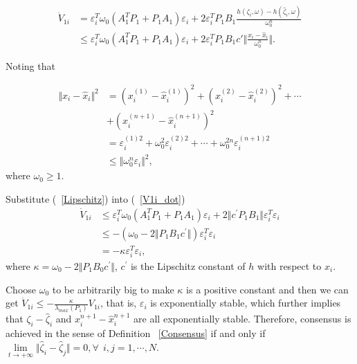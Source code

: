 \documentclass[english]{cccconf}
\begin{document}
\begin{equation}
\label{V1i_dot}
\begin{align}
\dot V_{1i} &= \varepsilon^T_i \omega_0 (A_1^T P_1 + P_1 A_1) \varepsilon_i + 2 \varepsilon^T_i P_1 B_1 \frac{h(\zeta_i,\omega)-h(\hat \zeta_i,\omega)}{\omega_0^n} \\ & \le \varepsilon^T_i \omega_0 (A_1^T P_1 + P_1 A_1) \varepsilon_i + 2 \varepsilon^T_i P_1 B_1 c' \Vert \frac{x_i- \hat x_i}{\omega_0^n} \Vert.  
\end{align}  
\end{equation}

Noting that 

\begin{equation}
  \label{Lipschitz}
  \begin{align} 
   {\Vert {x_i- \hat x_i} \Vert}^2 &= (x_i^{(1)}-\hat x_i^{(1)})^2 +  (x_i^{(2)}-\hat x_i^{(2)})^2 + \cdots \\ & +(x_i^{(n+1)}-\hat x_i^{(n+1)})^2\\ &= \varepsilon_i^{(1)2} + \omega_0^2 \varepsilon_i^{(2)2} + \cdots + \omega_0^{2n} \varepsilon_i^{(n+1)2}\\ &\le {\Vert \omega_0^{n} \varepsilon_i \Vert}^2 ,
  \end{align}
\end{equation} where $\omega_0 \geq 1$.

Substitute (~\ref{Lipschitz}) into (~\ref{V1i_dot})
\begin{equation}
\label{V1i_dot2}
\begin{align}
\dot V_{1i} &\le \varepsilon^T_i \omega_0 (A_1^T P_1 + P_1 A_1 ) \varepsilon_i + 2 \Vert c^{'} P_1 B_1 \Vert \varepsilon^T_i \varepsilon_i \\ &\le -(\omega_0 - 2\Vert P_{1}B_{1}c^{'} \Vert) \varepsilon^T_i \varepsilon_i\\ &= -\kappa \varepsilon^T_i \varepsilon_i,
\end{align}  
\end{equation}where $\kappa = \omega_0 - 2\Vert P_{1}B_{0}c^{'} \Vert$, $c^{'}$ is the Lipschitz constant of $h$ with respect to $x_i$. 

Choose $\omega_0$ to be arbitrarily big to make $\kappa$ is a positive constant and then we can get $\dot V_{1i} \le -\frac{\kappa}{\lambda_{max}(P_1)} V_{1i}$, that is, $\varepsilon_i$ is exponentially stable, which further implies that $\zeta_i - \hat \zeta_i$ and $x_i^{n+1} - \hat x_i^{n+1}$ are all exponentially stable. Therefore, consensus is achieved in the sense of Definition ~\ref{Consensus} if and only if $\mathop{lim}\limits_{t \to +\infty} \Vert \hat \zeta_i - \hat \zeta_j \Vert = 0, \forall ~~i, j=1,\cdots, N$.
\end{document}
